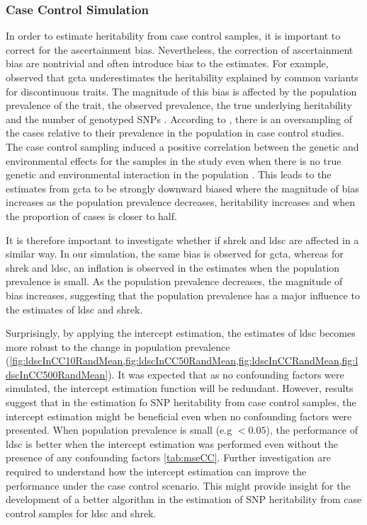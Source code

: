 	\subsubsection{Case Control Simulation}
	In order to estimate heritability from case control samples, it is important to correct for the ascertainment bias.
	Nevertheless, the correction of ascertainment bias are nontrivial and often introduce bias to the estimates. 
	For example, \citet{Golan2014} observed that \gls{gcta} underestimates the heritability explained by common variants for discontinuous traits.
	The magnitude of this bias is affected by the population prevalence of the trait, the observed prevalence, the true underlying heritability and the number of genotyped \glspl{SNP} \citep{Golan2014}.	
	According to \citet{Golan2014}, there is an oversampling of the cases relative to their prevalence in the population in case control studies.
	The case control sampling induced a positive correlation between the genetic and environmental effects for the samples in the study even when there is no true genetic and environmental interaction in the population \citep{Golan2014}.
	This leads to the estimates from \gls{gcta} to be strongly downward biased where the magnitude of bias increases as the population prevalence decreases, heritability increases and when the proportion of cases is closer to half.

	It is therefore important to investigate whether if \gls{shrek} and \gls{ldsc} are affected in a similar way.
	In our simulation, the same bias is observed for \gls{gcta}, whereas for \gls{shrek} and \gls{ldsc}, an inflation is observed in the estimates when the population prevalence is small.
	As the population prevalence decreases, the magnitude of bias increases, suggesting that the population prevalence has a major influence to the estimates of \gls{ldsc} and \gls{shrek}.
	
	Surprisingly, by applying the intercept estimation, the estimates of \gls{ldsc} becomes more robust to the change in population prevalence (\cref{fig:ldscInCC10RandMean,fig:ldscInCC50RandMean,fig:ldscInCCRandMean,fig:ldscInCC500RandMean}).
	It was expected that as no confounding factors were simulated, the intercept estimation function will be redundant.
	However, results suggest that in the estimation fo \gls{SNP} heritability from case control samples, the intercept estimation might be beneficial even when no confounding factors were presented.
	When population prevalence is small (e.g $<0.05$), the performance of \gls{ldsc} is better when the intercept estimation was performed even without the presence of any confounding factors \cref{tab:mseCC}.
	Further investigation are required to understand how the intercept estimation can improve the performance under the case control scenario.
	This might provide insight for the development of a better algorithm in the estimation of \gls{SNP} heritability from case control samples for \gls{ldsc} and \gls{shrek}.
	
